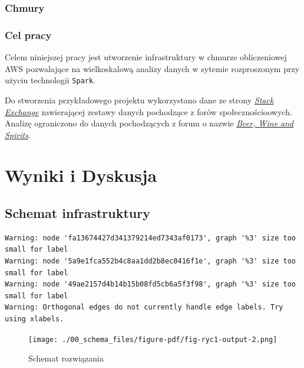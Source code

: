 \documentclass[
  letterpaper,
  DIV=11,
  numbers=noendperiod]{scrreprt}
\begin{document}
\hypertarget{chmury}{%
\section*{Chmury}\label{chmury}}


\hypertarget{cel-pracy}{%
\section*{Cel pracy}\label{cel-pracy}}


Celem niniejszej pracy jest utworzenie infrastruktury w chmurze
obliczeniowej AWS pozwalające na wielkoskalową analizy danych w sytemie
rozproszonym przy użyciu technologii \texttt{Spark}.

Do stworzenia przykładowego projektu wykorzystano dane ze strony
\href{https://stackexchange.com/}{\emph{Stack Exchange}} zawierającej
zestawy danych pochodzące z forów społecznościoowych. Analizę
ograniczono do danych pochodzących z forum o nazwie
\href{https://data.stackexchange.com/beer/queries}{\emph{Beer, Wine and
Spirits}}.

\part{Wyniki i Dyskusja}

\hypertarget{schemat-infrastruktury}{%
\chapter{Schemat infrastruktury}\label{schemat-infrastruktury}}

\begin{verbatim}
Warning: node 'fa13674427d341379214ed7343af0173', graph '%3' size too small for label
Warning: node '5a9e1fca552b4c8aa1dd2b8ec0416f1e', graph '%3' size too small for label
Warning: node '49ae2157d4b14b15b08fd5cb6a5f3f98', graph '%3' size too small for label
Warning: Orthogonal edges do not currently handle edge labels. Try using xlabels.
\end{verbatim}

\begin{figure}

{\centering \texttt{[image: ./00\_schema\_files/figure-pdf/fig-ryc1-output-2.png]}

}

\caption{\label{fig-ryc1}Schemat rozwiązania}

\end{figure}
\end{document}
